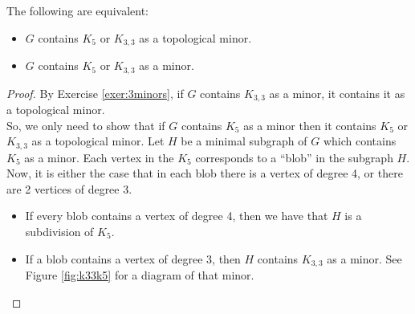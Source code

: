 \begin{prop}
	The following are equivalent:
	\begin{itemize}
	 \item $G$ contains $K_5$ or $K_{3,3}$ as a topological minor.
	 \item $G$ contains $K_5$ or $K_{3,3}$ as a minor. 
	\end{itemize}
\end{prop}
\begin{proof}
 By Exercise \ref{exer:3minors}, if $G$ contains $K_{3,3}$ as a minor, it contains it as a topological minor. \\
 So, we only need to show that if $G$ contains $K_5$ as a minor then it contains $K_5$ or $K_{3,3}$ as a topological minor. Let $H$ be a minimal subgraph of $G$ which contains $K_5$ as a minor. Each vertex in the $K_5$ corresponds to a ``blob'' in the subgraph $H$. Now, it is either the case that in each blob there is a vertex of degree 4, or there are 2 vertices of degree 3. 
 \begin{itemize}
 \item If every blob contains a vertex of degree 4, then we have that $H$ is a subdivision of $K_5$. 
 \item If a blob contains a vertex of degree 3, then $H$ contains $K_{3,3}$ as a minor. See Figure \ref{fig:k33k5} for a diagram of that minor. 
 \end{itemize}
\end{proof}
